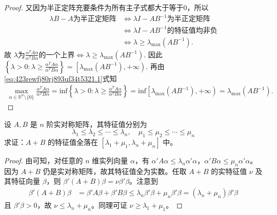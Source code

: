 \documentclass[../../main.tex]{subfiles}
\begin{document}
\begin{proof}
又因为半正定阵充要条件为所有主子式都大于等于$0$，所以
\begin{align*}
\lambda B-A\text{为半正定矩阵}&\Longleftrightarrow \lambda I-AB^{-1}\text{为半正定矩阵} \\
&\Longleftrightarrow \lambda I-AB^{-1}\text{的特征值均非负} \\
&\Longleftrightarrow \lambda \geqslant \lambda _{\max}\left( AB^{-1} \right) .
\end{align*}
故
$\lambda \text{为}\frac{\alpha ^TA\alpha}{\alpha ^TB\alpha}\text{的一个上界}\Longleftrightarrow \lambda \geqslant \lambda _{\max}\left( AB^{-1} \right) .$
因此
$\left\{ \lambda >0:\lambda \geqslant \frac{\alpha ^TA\alpha}{\alpha ^TB\alpha} \right\} =\left[ \lambda _{\max}\left( AB^{-1} \right) ,+\infty \right) .$
再由\eqref{eq:423rewfj80rj893uf34t5321.1}式知
\begin{align*}
\max_{\alpha \in \mathbb{R} ^n\setminus \{0\}} \frac{\alpha ^TA\alpha}{\alpha ^TB\alpha}=\mathrm{inf}\left\{ \lambda >0:\lambda \geqslant \frac{\alpha ^TA\alpha}{\alpha ^TB\alpha} \right\} =\mathrm{inf}\left[ \lambda _{\max}\left( AB^{-1} \right) ,+\infty \right) =\lambda _{\max}\left( AB^{-1} \right) .
\end{align*}

\end{proof}

\begin{example}\label{example:例9.53}
设 \(A,B\) 是 \(n\) 阶实对称矩阵，其特征值分别为
\[
\lambda_1 \leqslant  \lambda_2 \leqslant  \cdots \leqslant  \lambda_n,\quad \mu_1 \leqslant  \mu_2 \leqslant  \cdots \leqslant  \mu_n
\]
求证：\(A + B\) 的特征值全落在 \([\lambda_1 + \mu_1,\lambda_n + \mu_n]\) 中。
\end{example}
\begin{proof}
由可知，对任意的 \(n\) 维实列向量 \(\alpha\)，有 \(\alpha'A\alpha \leqslant  \lambda_n\alpha'\alpha\)，\(\alpha'B\alpha \leqslant  \mu_n\alpha'\alpha\)。因为 \(A + B\) 仍是实对称矩阵，故其特征值全为实数。任取 \(A + B\) 的实特征值 \(\nu\) 及其特征向量 \(\beta\)，则 \(\beta'(A + B)\beta = \nu\beta'\beta\)。注意到
\begin{align*}
\beta'(A + B)\beta &= \beta'A\beta + \beta'B\beta \leqslant  \lambda_n\beta'\beta + \mu_n\beta'\beta = (\lambda_n + \mu_n)\beta'\beta
\end{align*}
且 \(\beta'\beta > 0\)，故 \(\nu \leqslant  \lambda_n + \mu_n\)。同理可证 \(\nu \geqslant  \lambda_1 + \mu_1\)。 

\end{proof}
\end{document}
